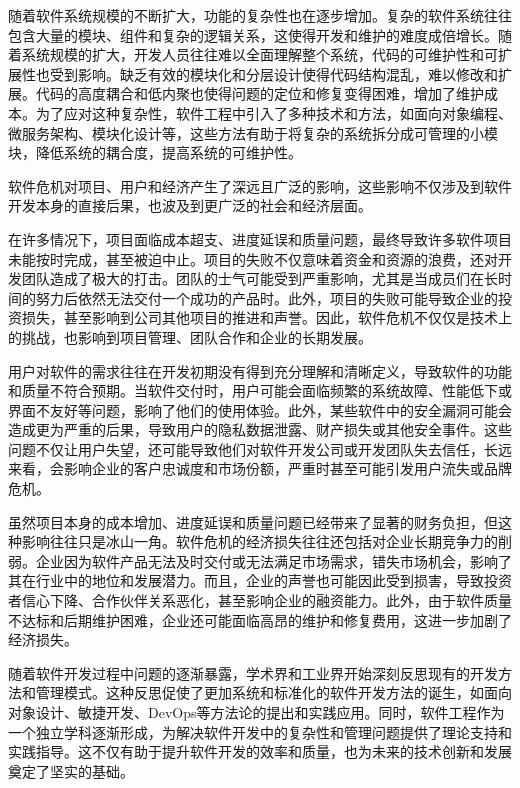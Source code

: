 随着软件系统规模的不断扩大，功能的复杂性也在逐步增加。复杂的软件系统往往包含大量的模块、组件和复杂的逻辑关系，这使得开发和维护的难度成倍增长。随着系统规模的扩大，开发人员往往难以全面理解整个系统，代码的可维护性和可扩展性也受到影响。缺乏有效的模块化和分层设计使得代码结构混乱，难以修改和扩展。代码的高度耦合和低内聚也使得问题的定位和修复变得困难，增加了维护成本。为了应对这种复杂性，软件工程中引入了多种技术和方法，如面向对象编程、微服务架构、模块化设计等，这些方法有助于将复杂的系统拆分成可管理的小模块，降低系统的耦合度，提高系统的可维护性。


软件危机对项目、用户和经济产生了深远且广泛的影响，这些影响不仅涉及到软件开发本身的直接后果，也波及到更广泛的社会和经济层面。

在许多情况下，项目面临成本超支、进度延误和质量问题，最终导致许多软件项目未能按时完成，甚至被迫中止。项目的失败不仅意味着资金和资源的浪费，还对开发团队造成了极大的打击。团队的士气可能受到严重影响，尤其是当成员们在长时间的努力后依然无法交付一个成功的产品时。此外，项目的失败可能导致企业的投资损失，甚至影响到公司其他项目的推进和声誉。因此，软件危机不仅仅是技术上的挑战，也影响到项目管理、团队合作和企业的长期发展。

用户对软件的需求往往在开发初期没有得到充分理解和清晰定义，导致软件的功能和质量不符合预期。当软件交付时，用户可能会面临频繁的系统故障、性能低下或界面不友好等问题，影响了他们的使用体验。此外，某些软件中的安全漏洞可能会造成更为严重的后果，导致用户的隐私数据泄露、财产损失或其他安全事件。这些问题不仅让用户失望，还可能导致他们对软件开发公司或开发团队失去信任，长远来看，会影响企业的客户忠诚度和市场份额，严重时甚至可能引发用户流失或品牌危机。

虽然项目本身的成本增加、进度延误和质量问题已经带来了显著的财务负担，但这种影响往往只是冰山一角。软件危机的经济损失往往还包括对企业长期竞争力的削弱。企业因为软件产品无法及时交付或无法满足市场需求，错失市场机会，影响了其在行业中的地位和发展潜力。而且，企业的声誉也可能因此受到损害，导致投资者信心下降、合作伙伴关系恶化，甚至影响企业的融资能力。此外，由于软件质量不达标和后期维护困难，企业还可能面临高昂的维护和修复费用，这进一步加剧了经济损失。

随着软件开发过程中问题的逐渐暴露，学术界和工业界开始深刻反思现有的开发方法和管理模式。这种反思促使了更加系统和标准化的软件开发方法的诞生，如面向对象设计、敏捷开发、DevOps等方法论的提出和实践应用。同时，软件工程作为一个独立学科逐渐形成，为解决软件开发中的复杂性和管理问题提供了理论支持和实践指导。这不仅有助于提升软件开发的效率和质量，也为未来的技术创新和发展奠定了坚实的基础。

